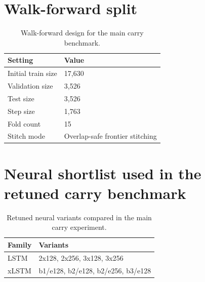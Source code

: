 \documentclass[12pt]{report}
\begin{document}
\section{Walk-forward split}
\begin{table}[H]
\centering
\caption{Walk-forward design for the main carry benchmark.}
\footnotesize
\renewcommand{\arraystretch}{1.15}
\begin{tabularx}{\textwidth}{@{}lY@{}}
\toprule
\textbf{Setting} & \textbf{Value} \\
\midrule
Initial train size & 17,630 \\
Validation size & 3,526 \\
Test size & 3,526 \\
Step size & 1,763 \\
Fold count & 15 \\
Stitch mode & Overlap-safe frontier stitching \\
\bottomrule
\end{tabularx}
\end{table}

\section{Neural shortlist used in the retuned carry benchmark}
\begin{table}[H]
\centering
\caption{Retuned neural variants compared in the main carry experiment.}
\footnotesize
\renewcommand{\arraystretch}{1.15}
\begin{tabularx}{\textwidth}{@{}lY@{}}
\toprule
\textbf{Family} & \textbf{Variants} \\
\midrule
LSTM & 2x128, 2x256, 3x128, 3x256 \\
xLSTM & b1/e128, b2/e128, b2/e256, b3/e128 \\
\bottomrule
\end{tabularx}
\end{table}
\end{document}
